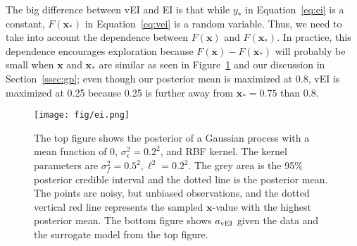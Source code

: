 The big difference between vEI and EI is that while $y_*$ in Equation~\ref{eq:ei} is a constant, $F(\mathbf{x}_*)$ in Equation~\ref{eq:vei} is a random variable.
Thus, we need to take into account the dependence between $F(\mathbf{x})$ and $F(\mathbf{x}_*)$.
In practice,
this dependence encourages exploration
because $F(\mathbf{x}) - F(\mathbf{x}_*)$ will probably be small when
$\mathbf{x}$ and $\mathbf{x}_*$ are similar as seen in Figure~\ref{fig:ei} and our discussion in Section~\ref{ssec:gp};
even though our posterior mean is maximized at 0.8, vEI is maximized at 0.25 because 0.25 is further away from $\mathbf{x}_* = 0.75$ than 0.8.

\begin{figure}[t]
    \centering
    \texttt{[image: fig/ei.png]}
    \caption{
        The top figure shows the posterior of a Gaussian process with a mean function of 0,
        $\sigma_{\epsilon}^2 = 0.2^2$, and RBF kernel.
        The kernel parameters are $\sigma_f^2 = 0.5^2, \ell^2 = 0.2^2$.
        The grey area is the 95\% posterior credible interval and the dotted line is the posterior mean.
        The points are noisy, but unbiased observations, and the dotted vertical red line represents the sampled $\mathbf{x}$-value with the highest posterior mean.
        The bottom figure shows $a_{\mathrm{vEI}}$ given the data and the surrogate model from the top figure.
    }
    \label{fig:ei}

\end{figure}

